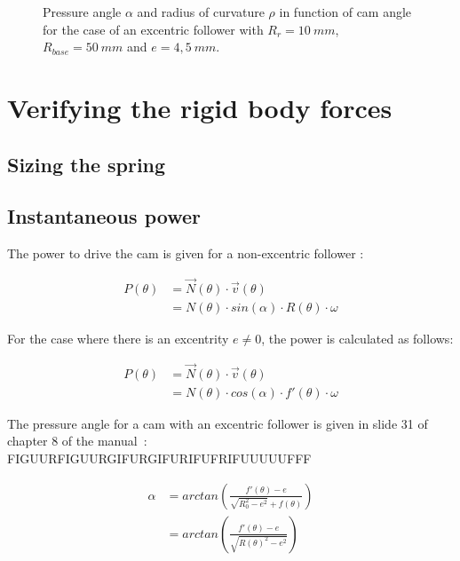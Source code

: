 \documentclass[a4paper]{article}
\begin{document}
\begin{figure}
	\caption{Pressure angle \(\alpha\) and radius of curvature \(\rho\) in function of cam angle for the case of an excentric follower with \(R_r=10~mm\), \(R_{base}=50~mm\) and \(e=4,5~mm\).}
	\label{fig:geomet}
	
\end{figure}

\section{Verifying the rigid body forces}

\subsection{Sizing the spring}

\subsection{Instantaneous power}
\label{sec:power}

The power to drive the cam is given for a non-excentric follower \cite{vermogen}:

\begin{equation}
	\begin{split}
	P(\theta) & = \vec{N}(\theta)\cdot\vec{v}(\theta) \\
	&=N(\theta)\cdot sin(\alpha)\cdot R(\theta)\cdot \omega
	\end{split}
\end{equation}

For the case where there is an excentrity \(e\neq0\), the power is calculated as follows:

\begin{equation}
	\begin{split}
	P(\theta) & = \vec{N}(\theta)\cdot\vec{v}(\theta) \\
	&=N(\theta)\cdot cos(\alpha)\cdot f'(\theta)\cdot\omega
	\end{split}
	\label{eq:verm_exc1}
\end{equation}

The pressure angle for a cam with an excentric follower is given in slide 31 of chapter 8 of the manual~\cite{cursus}: FIGUURFIGUURGIFURGIFURIFUFRIFUUUUUFFF

\begin{equation}
	\begin{split}
	\alpha& = arctan\left(\frac{f'(\theta)-e}{\sqrt{R_0^2-e^2}+f(\theta)}\right)\\
	&=arctan\left(\frac{f'(\theta)-e}{\sqrt{R(\theta)^2-e^2}}\right)
	\end{split}
	\label{eq:verm_exc2}
\end{equation}
\end{document}

